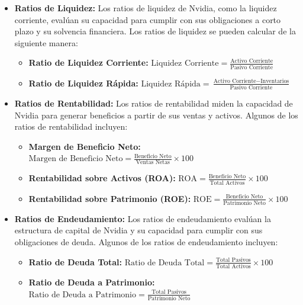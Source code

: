 \documentclass{article}
\begin{document}
\begin{itemize}
  \item \textbf{Ratios de Liquidez:} Los ratios de liquidez de Nvidia, como la liquidez corriente, evalúan su capacidad para cumplir con sus obligaciones a corto plazo y su solvencia financiera. Los ratios de liquidez se pueden calcular de la siguiente manera:
  \begin{itemize}
    \item \textbf{Ratio de Liquidez Corriente:} \(\text{Liquidez Corriente} = \frac{\text{Activo Corriente}}{\text{Pasivo Corriente}}\)
    \item \textbf{Ratio de Liquidez Rápida:} \(\text{Liquidez Rápida} = \frac{\text{Activo Corriente} - \text{Inventarios}}{\text{Pasivo Corriente}}\)
  \end{itemize}

  \item \textbf{Ratios de Rentabilidad:} Los ratios de rentabilidad miden la capacidad de Nvidia para generar beneficios a partir de sus ventas y activos. Algunos de los ratios de rentabilidad incluyen:
  \begin{itemize}
    \item \textbf{Margen de Beneficio Neto:} \(\text{Margen de Beneficio Neto} = \frac{\text{Beneficio Neto}}{\text{Ventas Netas}} \times 100\)
    \item \textbf{Rentabilidad sobre Activos (ROA):} \(\text{ROA} = \frac{\text{Beneficio Neto}}{\text{Total Activos}} \times 100\)
    \item \textbf{Rentabilidad sobre Patrimonio (ROE):} \(\text{ROE} = \frac{\text{Beneficio Neto}}{\text{Patrimonio Neto}} \times 100\)
  \end{itemize}

\newpage

  \item \textbf{Ratios de Endeudamiento:} Los ratios de endeudamiento evalúan la estructura de capital de Nvidia y su capacidad para cumplir con sus obligaciones de deuda. Algunos de los ratios de endeudamiento incluyen:
  \begin{itemize}
    \item \textbf{Ratio de Deuda Total:} \(\text{Ratio de Deuda Total} = \frac{\text{Total Pasivos}}{\text{Total Activos}} \times 100\)
    \item \textbf{Ratio de Deuda a Patrimonio:} \(\text{Ratio de Deuda a Patrimonio} = \frac{\text{Total Pasivos}}{\text{Patrimonio Neto}}\)
  \end{itemize}


\end{itemize}
\end{document}
